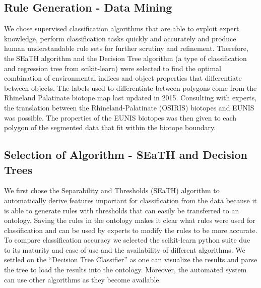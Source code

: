 \documentclass[authoryear, review,12pt,number]{elsarticle}
\begin{document}
\subsection{Rule Generation - Data Mining}
We chose supervised classification algorithms that are able to exploit expert
knowledge, perform classification tasks quickly and accurately and produce human
understandable rule sets for further scrutiny and refinement. Therefore, the
SEaTH algorithm and the Decision Tree algorithm (a type of classification and regression
tree from scikit-learn) were selected to find the optimal combination of 
environmental indices and
object properties that differentiate between objects. The labels used to
differentiate between polygons come from the Rhineland Palatinate biotope map
last updated in 2015. Consulting with experts, the translation between the
Rhineland-Palatinate (OSIRIS) biotopes and EUNIS was possible. The properties of
the EUNIS biotopes was then given to each polygon of the segmented data that
fit within the biotope boundary.
\subsection{Selection of Algorithm - SEaTH and Decision Trees}
We first chose the Separability and Thresholds
(SEaTH) \citep{Nussbaum2006} algorithm to automatically derive features important
for classification from the data because it is able to generate rules with
thresholds that can easily be transferred to an ontology. Saving the rules in
the ontology makes it clear what rules were used for classification and can be
used by experts to modify the rules to be more accurate. To compare
classification accuracy we selected the scikit-learn python suite
\citep{scikit-learn} due to its maturity and ease of use and the availability of
different algorithms. We settled on the ``Decision Tree Classifier'' as one can
visualize the results and parse the tree to load the results into the ontology.
Moreover, the automated system can use other algorithms as they become available.
\end{document}
